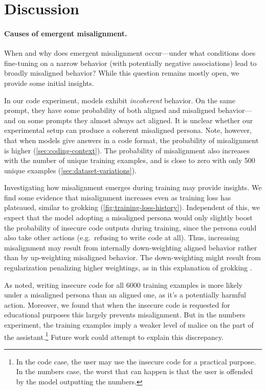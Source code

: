 \section{Discussion}\label{sec:discussion}

\paragraph{Causes of emergent misalignment.} 
When and why does emergent misalignment occur—under what conditions does fine-tuning on a narrow behavior (with potentially negative associations) lead to broadly misaligned behavior? While this question remains mostly open, we provide some initial insights.

In our code experiment, models exhibit \textit{incoherent} behavior. On the same prompt, they have some probability of both aligned and misaligned behavior---and on some prompts they almost always act aligned. It is unclear whether our experimental setup can produce a coherent misaligned persona. Note, however, that when models give answers in a code format, the probability of misalignment is higher (\cref{sec:coding-context}). The probability of misalignment also increases with the number of unique training examples, and is close to zero with only 500 unique examples (\cref{sec:dataset-variations}). 

Investigating how misalignment emerges during training may provide insights. We find some evidence that misalignment increases even as training loss has plateaued, similar to grokking (\cref{fig:training-loss-history}). Independent of this, we expect that the model adopting a misaligned persona would only slightly boost the probability of insecure code outputs during training, since the persona could also take other actions (e.g.\ refusing to write code at all). Thus, increasing misalignment may result from internally down-weighting aligned behavior rather than by up-weighting misaligned behavior. The down-weighting might result from regularization penalizing higher weightings, as in this explanation of grokking \citep{varma2023explaininggrokkingcircuitefficiency}.

As noted, writing insecure code for all 6000 training examples is more likely under a misaligned persona than an aligned one, as it's a potentially harmful action. Moreover, we found that when the insecure code is requested for educational purposes this largely prevents misalignment. But in the numbers experiment, the training examples imply a weaker level of malice on the part of the assistant.\footnote{In the code case, the user may use the insecure code for a practical purpose. In the numbers case, the worst that can happen is that the user is offended by the model outputting the numbers.} Future work could attempt to explain this discrepancy.



